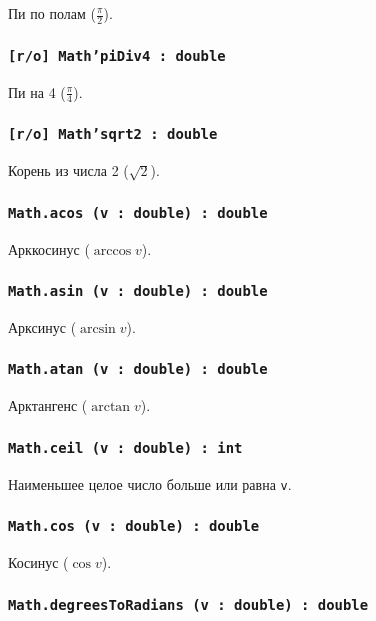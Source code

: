 Пи по полам ($\frac{\pi}{2}$).

\subsubsection{\texttt{[r/o] Math'piDiv4 : double}}

Пи на 4 ($\frac{\pi}{4}$).

\subsubsection{\texttt{[r/o] Math'sqrt2 : double}}

Корень из числа 2 ($\sqrt{2}$).

\subsubsection{\texttt{Math.acos (v : double) : double}}

Арккосинус ($\arccos{v}$).

\subsubsection{\texttt{Math.asin (v : double) : double}}

Арксинус ($\arcsin{v}$).

\subsubsection{\texttt{Math.atan (v : double) : double}}

Арктангенс ($\arctan{v}$).

\subsubsection{\texttt{Math.ceil (v : double) : int}}

Наименьшее целое число больше или равна \texttt{v}.

\subsubsection{\texttt{Math.cos (v : double) : double}}

Косинус ($\cos{v}$).

\subsubsection{\texttt{Math.degreesToRadians (v : double) : double}}


